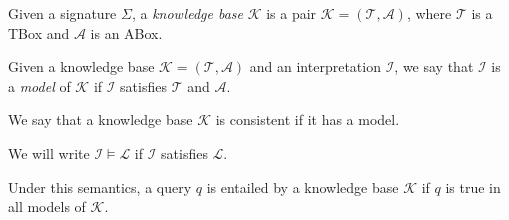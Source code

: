 \begin{definition}
    Given a signature $\Sigma$, a \emph{knowledge base} $\mathcal{K}$ is a pair $\mathcal{K} = (\mathcal{T}, \mathcal{A})$,
    where $\mathcal{T}$ is a TBox and $\mathcal{A}$ is an ABox.
\end{definition}

\begin{definition}[Model]
    Given a knowledge base $\mathcal{K} = (\mathcal{T}, \mathcal{A})$ and an interpretation $\mathcal{I}$,
    we say that $\mathcal{I}$ is a \emph{model} of $\mathcal{K}$ if $\mathcal{I}$ satisfies $\mathcal{T}$ and $\mathcal{A}$.

    We say that a knowledge base $\mathcal{K}$ is
consistent if it has a model.
\end{definition}

\begin{notation}[Satisfiability]
    We will write $\mathcal{I}\vDash\mathcal{L}$ if $\mathcal{I}$ satisfies $\mathcal{L}$.
\end{notation}

Under this semantics, a query $q$ is entailed by a knowledge base $\mathcal{K}$ if $q$ is true in all models of $\mathcal{K}$.